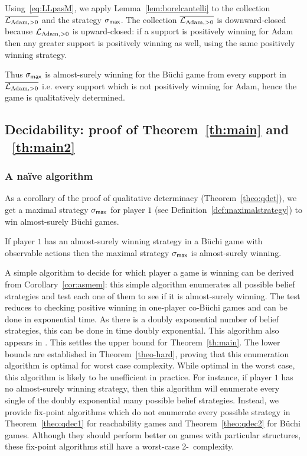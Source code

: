 \medskip


Using~\eqref{eq:LLpasM}, 
we apply Lemma~\ref{lem:borelcantelli} to the collection 
$\overline{\mathcal{L}_{\text{Adam},>0}}$ and the strategy $\sigma_{\textsf{max}}$.
The collection $\overline{\mathcal{L}_{\text{Adam},>0}}$ is downward-closed because $\mathcal{L}_{\text{Adam},>0}$ is upward-closed: if a support is positively winning for Adam then any greater support is positively winning as well, using the same positively winning strategy.

Thus $\sigma_{\textsf{max}}$ is almost-surely winning for the B{\"u}chi game from every support in $\overline{\mathcal{L}_{\text{Adam},>0}}$ i.e. every support which is not positively winning for Adam, hence the game is qualitatively determined.

\subsection{Decidability: proof of Theorem~\ref{th:main} and ~\ref{th:main2}}

\subsubsection{A na\"ive algorithm}
As a corollary of the proof of qualitative determinacy
(Theorem~\ref{theo:qdet}), we get a maximal strategy $\sigma_{\textsf{max}}$
for player $1$ (see Definition~\ref{def:maximalstrategy}) to win
almost-surely B{\"u}chi games.
\begin{corollary}\label{cor:asmem}
  If player $1$ has an almost-surely winning strategy in a B{\"u}chi
  game {with observable actions} then the maximal strategy $\sigma_{\textsf{max}}$ is almost-surely
  winning.
\end{corollary}

{
   A simple algorithm to decide for which player a
  game is winning can be derived from Corollary~\ref{cor:asmem}:
this simple algorithm enumerates all possible belief strategies
  and test each one of them to see if it is almost-surely
  winning. The test reduces to checking positive winning in one-player co-B{\"u}chi games
and can be done in exponential time.
}
As there is a doubly exponential number of {belief} strategies, 
   this can be done in time doubly exponential. 
This algorithm also appears in \cite{GS-icalp09}.
 This settles the upper bound for Theorem~\ref{th:main}. The lower bounds are established in
  Theorem~\ref{theo-hard}, proving that this enumeration algorithm is
  optimal for worst case complexity.  While optimal in the worst case,
  this algorithm is {likely to be unefficient in practice}.  For instance, if player
  $1$ has no almost-surely winning strategy, then this algorithm will
  enumerate every single of the doubly exponential many {possible belief}
  strategies.  Instead, we provide fix-point algorithms which do not
  enumerate every possible strategy in Theorem~\ref{theo:qdec1} for
  reachability games and Theorem~\ref{theo:qdec2} for B{\"u}chi games.
  Although they should perform better on games with particular
  structures, these fix-point algorithms still have a worst-case
  2-\EXPTIME\ complexity.


